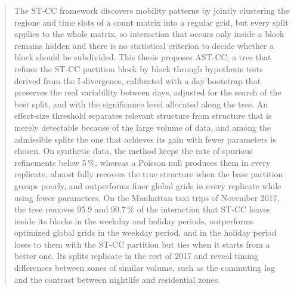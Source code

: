 \begin{abstract}
The ST-CC framework discovers mobility patterns by jointly clustering the regions and time slots of a count matrix into a regular grid, but every split applies to the whole matrix, so interaction that occurs only inside a block remains hidden and there is no statistical criterion to decide whether a block should be subdivided. This thesis proposes AST-CC, a tree that refines the ST-CC partition block by block through hypothesis tests derived from the I-divergence, calibrated with a day bootstrap that preserves the real variability between days, adjusted for the search of the best split, and with the significance level allocated along the tree. An effect-size threshold separates relevant structure from structure that is merely detectable because of the large volume of data, and among the admissible splits the one that achieves its gain with fewer parameters is chosen. On synthetic data, the method keeps the rate of spurious refinements below 5\,\%, whereas a Poisson null produces them in every replicate, almost fully recovers the true structure when the base partition groups poorly, and outperforms finer global grids in every replicate while using fewer parameters. On the Manhattan taxi trips of November 2017, the tree removes 95.9 and 90.7\,\% of the interaction that ST-CC leaves inside its blocks in the weekday and holiday periods, outperforms optimized global grids in the weekday period, and in the holiday period loses to them with the ST-CC partition but ties when it starts from a better one. Its splits replicate in the rest of 2017 and reveal timing differences between zones of similar volume, such as the commuting lag and the contrast between nightlife and residential zones.
\end{abstract}
